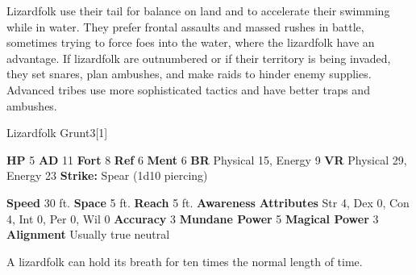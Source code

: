       Lizardfolk use their tail for balance on land and to accelerate their swimming while in water.
      They prefer frontal assaults and massed rushes in battle, sometimes trying to force foes into the water, where the lizardfolk have an advantage.
      If lizardfolk are outnumbered or if their territory is being invaded, they set snares, plan ambushes, and make raids to hinder enemy supplies.
      Advanced tribes use more sophisticated tactics and have better traps and ambushes.
    

      
  \begin{monsubsection}{Lizardfolk Grunt}{3}[1]
    \vspace{-1em}\vspace{-1em}
    \vspace{0em}

    
    

    \begin{spellcontent}
      \begin{spelltargetinginfo}
        \pari \textbf{HP} 5 \monsep
          \textbf{AD} 11 \monsep
          \textbf{Fort} 8 \monsep
          \textbf{Ref} 6 \monsep
          \textbf{Ment} 6
        \pari \textbf{BR} Physical 15, Energy 9 \monsep
        \textbf{VR} Physical 29, Energy 23
        \pari \textbf{Strike:}
            Spear  (1d10 piercing)
      \end{spelltargetinginfo}
    \end{spellcontent}
    \begin{monsterfooter}
      \pari \textbf{Speed} 30 ft. \monsep
        \textbf{Space} 5 ft. \monsep
        \textbf{Reach} 5 ft.
      \pari \textbf{Awareness} 
      \pari \textbf{Attributes}
        Str 4, Dex 0,
        Con 4, Int 0,
        Per 0, Wil 0
      \pari \textbf{Accuracy} 3 \monsep
        \textbf{Mundane Power} 5 \monsep
      \textbf{Magical Power} 3
      \pari \textbf{Alignment} Usually true neutral
    \end{monsterfooter}
  \end{monsubsection}
   A lizardfolk can hold its breath for ten times the normal length of time.
  

